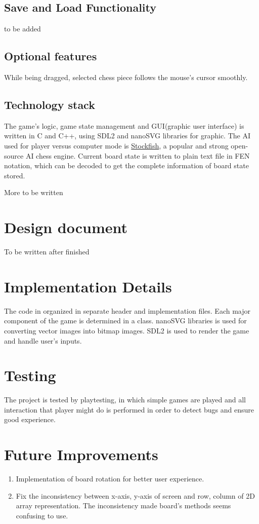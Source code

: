 \documentclass[a4paper, 10pt, titlepage]{article}
\begin{document}
\subsection{Save and Load Functionality}
to be added
\subsection{Optional features}
While being dragged, selected chess piece follows the mouse's cursor smoothly.
\subsection{Technology stack}
The game's logic, game state management and GUI(graphic user interface) is written in C and C++, using SDL2 and nanoSVG libraries for graphic. The AI used for player versus computer mode is \href{https://github.com/official-stockfish/Stockfish}{Stockfish}, a popular and strong open-source AI chess engine. Current board state is written to plain text file in FEN notation, which can be decoded to get the complete information of board state stored. 

More to be written
\section{Design document}
To be written after finished
\section{Implementation Details}
The code in organized in separate header and implementation files.
Each major component of the game is determined in a class.
nanoSVG libraries is used for converting vector images into bitmap images. SDL2 is used to render the game and handle user's inputs.
\section{Testing}
The project is tested by playtesting, in which simple games are played and all interaction that player might do is performed in order to detect bugs and ensure good experience.
\section{Future Improvements}
\begin{enumerate}
    \item Implementation of board rotation for better user experience.
    \item Fix the inconsistency between x-axis, y-axis of screen and row, column of 2D array representation. The inconsistency made board's methods seems confusing to use. 
\end{enumerate}
\end{document}
